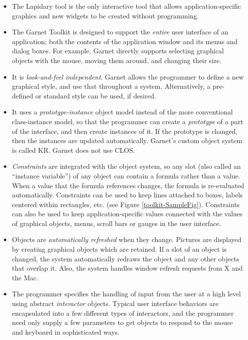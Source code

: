 \documentclass{report}
\begin{document}
\begin{itemize}
\item The Lapidary tool is the only interactive tool that allows
  application-specific graphics and new widgets to be created without
  programming.
  
\item The Garnet Toolkit is designed to support the {\it entire} user
  interface of an application; both the contents of the application
  window and its menus and dialog boxes.  For example, Garnet directly
  supports selecting graphical objects with the mouse, moving them
  around, and changing their size.
  
\item It is {\it look-and-feel independent}.  Garnet allows the
  programmer to define a new graphical style, and use that throughout
  a system.  Alternatively, a pre-defined or standard style can be
  used, if desired.
  
\item It uses a {\it prototype-instance} object model instead of the
  more conventional class-instance model, so that the programmer can
  create a {\it prototype} of a part of the interface, and then create
  instances of it.  If the prototype is changed, then the instances
  are updated automatically.  Garnet's custom object system is called
  KR.  Garnet does not use CLOS.
  
\item {\it Constraints} are integrated with the object system, so any
  slot (also called an ``instance variable'') of any object can
  contain a formula rather than a value.  When a value that the
  formula references changes, the formula is re-evaluated
  automatically.  Constraints can be used to keep lines attached to
  boxes, labels centered within rectangles, etc. (see Figure
  \ref{toolkit-SampleFig}).  Constraints can also be used to keep
  application-specific values connected with the values of graphical
  objects, menus, scroll bars or gauges in the user interface.
  
\item Objects are {\it automatically refreshed} when they change.
  Pictures are displayed by creating graphical objects which are
  retained.  If a slot of an object is changed, the system
  automatically redraws the object and any other objects that overlap
  it.  Also, the system handles window refresh requests from X and the
  Mac.
  
\item The programmer specifies the handling of input from the user at
  a high level using abstract {\it interactor} objects.  Typical user
  interface behaviors are encapsulated into a few different types of
  interactors, and the programmer need only supply a few parameters to
  get objects to respond to the mouse and keyboard in sophisticated
  ways.
  

\end{itemize}
\end{document}
